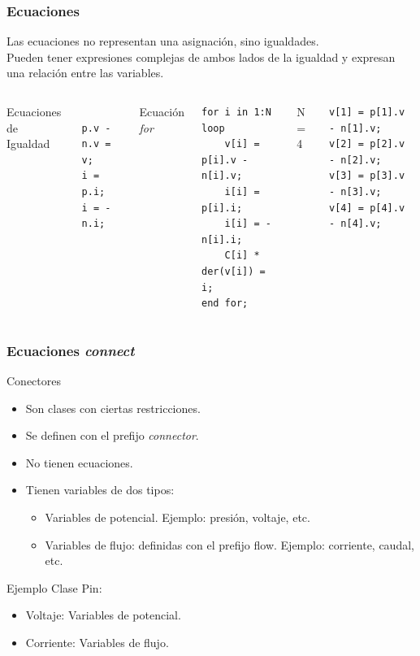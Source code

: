 \documentclass[aspectratio=169,10pt]{beamer}
\begin{document}
\begin{frame}[fragile,t]
\frametitle{Ecuaciones} 
\begin{block}{}
Las ecuaciones no representan una asignación, sino igualdades.\\ Pueden tener expresiones complejas de ambos lados de la igualdad y expresan una relación entre las variables.
\end{block}
\vspace{0.1cm}
\begin{columns}  
\column[t]{4cm}
Ecuaciones de Igualdad
\vspace{0.2cm}
\begin{lstlisting}[style=base]

p.v - n.v = v;
i = p.i;
i = -n.i;
\end{lstlisting} 
\column[t]{5cm}
Ecuación \textit{for}
\vspace{0.2cm}
\begin{lstlisting}[style=base]
for i in 1:N loop
    v[i] = p[i].v - n[i].v;
    i[i] = p[i].i;
    i[i] = -n[i].i;
    C[i] * der(v[i]) = i;
end for;
\end{lstlisting} 
\column[t]{4cm} 
N = 4
\vspace{0.2cm}
\begin{lstlisting}[style=base]
v[1] = p[1].v - n[1].v;       
v[2] = p[2].v - n[2].v;
v[3] = p[3].v - n[3].v;
v[4] = p[4].v - n[4].v;
\end{lstlisting} 
\end{columns}
\end{frame}

\begin{frame}[fragile]
\frametitle{Ecuaciones \textit{connect}} 
\begin{block}{Conectores}
\begin{itemize}
\item Son clases con ciertas restricciones.
\item Se definen con el prefijo \textit{connector}.
\item No tienen ecuaciones.
\item Tienen variables de dos tipos:
    \begin{itemize}
        \item Variables de potencial. Ejemplo: presión, voltaje, etc. 
        \item Variables de flujo: definidas con el prefijo flow. Ejemplo: corriente, caudal, etc.
    \end{itemize} 
\end{itemize}
\end{block}
\begin{block}{Ejemplo}
Clase Pin:
\begin{itemize}
    \item Voltaje: Variables de potencial.
    \item Corriente: Variables de flujo.
\end{itemize}
\end{block}
\end{frame}
\end{document}
